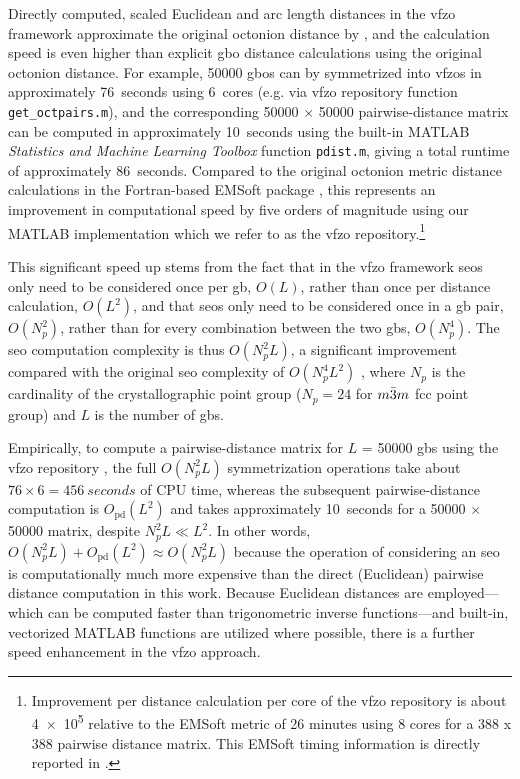 \documentclass[final,twocolumn,12pt]{elsarticle}
\newcommand{\vfzorepo}{\gls{vfzo} repository}
\newcommand{\symtime}{76}
\begin{document}
Directly computed, scaled Euclidean and arc length distances in the \gls{vfzo} framework approximate the original octonion distance by \citet{francisGeodesicOctonionMetric2019}, and the calculation speed is even higher than explicit \gls{gbo} distance calculations using the original octonion distance. For example, \num{50000} \glspl{gbo} can by symmetrized into \glspl{vfzo} in approximately \SI{\symtime}{seconds} using \SI{6}{cores} (e.g. via \vfzorepo{} function \texttt{get\_octpairs.m}), and the corresponding \num{50000} $\times$ \num{50000} pairwise-distance matrix can be computed in approximately \SI{10}{seconds} using the built-in MATLAB \textit{Statistics and Machine Learning Toolbox} function \texttt{pdist.m}, giving a total runtime of approximately \SI{86}{seconds}. Compared to the original octonion metric distance calculations \cite{chesserLearningGrainBoundary2020} in the Fortran-based EMSoft package \cite{degraefEMSoft2020}, this represents an improvement in computational speed by five orders of magnitude using our MATLAB implementation \cite{bairdFiveDegreeofFreedom5DOF2020} which we refer to as the \vfzorepo{}.\footnote{Improvement per distance calculation per core of the \vfzorepo{} is about \num{4e5} relative to the EMSoft \cite{degraefEMSoft2020} metric of 26 minutes using 8 cores for a 388 x 388 pairwise distance matrix. This EMSoft timing information is directly reported in \cite{chesserLearningGrainBoundary2020}.} %

This significant speed up stems from the fact that in the \gls{vfzo} framework \glspl{seo} only need to be considered once per \gls{gb}, $O(L)$, rather than once per distance calculation, $O(L^2)$,
and that \glspl{seo} only need to be considered once in a \gls{gb} pair, $O(N_p^2)$, rather than for every combination between the two \glspl{gb}, $O(N_p^4)$. The \gls{seo} computation complexity is thus $O(N_p^2L)$, a significant improvement compared with the original \gls{seo} complexity of $O(N_p^4L^2)$ \cite{chesserLearningGrainBoundary2020}, where $N_p$ is the cardinality of the crystallographic point group ($N_p=24$ for $m\Bar{3}m$ \gls{fcc} point group) and $L$ is the number of \glspl{gb}. 

Empirically, to compute a pairwise-distance matrix for $L$ = \num{50000} \glspl{gb} using the \vfzorepo{} \cite{bairdFiveDegreeofFreedom5DOF2020}, the full $O(N_p^2L)$ symmetrization operations take about $\symtime{}\times 6 = \SI{456}{seconds}$ of CPU time, whereas the subsequent pairwise-distance computation is $O_{\text{pd}}(L^2)$ and takes approximately \SI{10}{seconds} for a \num{50000} $\times$ \num{50000} matrix, despite $N_p^2L \ll L^2$. In other words, $O(N_p^2L)+O_\text{pd}(L^2)\approx O(N_p^2L)$  because the operation of considering an \gls{seo} is computationally much more expensive than the direct (Euclidean) pairwise distance computation in this work. Because Euclidean distances are employed---which can be computed faster than trigonometric inverse functions---and built-in, vectorized MATLAB functions are utilized where possible, there is a further speed enhancement in the \gls{vfzo} approach. %
\end{document}
